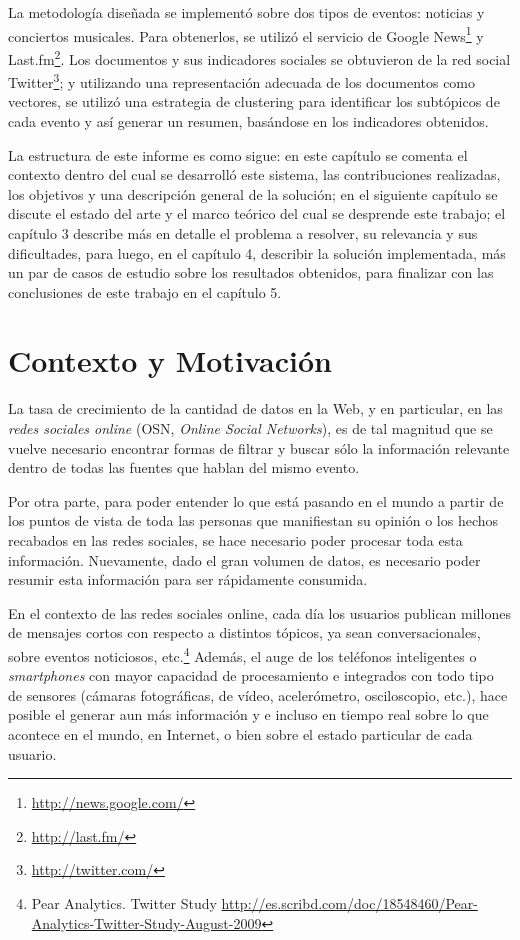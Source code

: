   La metodología diseñada se implementó sobre dos tipos de eventos:
  noticias y conciertos musicales. Para obtenerlos, se utilizó
  el servicio de Google News\footnote{\href{http://news.google.com/}{http://news.google.com/} } y
  Last.fm\footnote{\href{http://last.fm/}{http://last.fm/} }. Los documentos y sus indicadores
  sociales se obtuvieron de la red social
  Twitter\footnote{\href{http://twitter.com/}{http://twitter.com/} }; y utilizando una representación
  adecuada de los documentos como vectores, se utilizó una estrategia
  de clustering para identificar los subtópicos de cada evento y así
  generar un resumen, basándose en los indicadores obtenidos.

  La estructura de este informe es como sigue: en este capítulo se
  comenta el contexto dentro del cual se desarrolló este sistema, las
  contribuciones realizadas, los objetivos y una descripción general
  de la solución; en el siguiente capítulo se discute el estado del
  arte y el marco teórico del cual se desprende este trabajo; el
  capítulo 3 describe más en detalle el problema a resolver, su
  relevancia y sus dificultades, para luego, en el
  capítulo 4, describir la solución implementada, más un par de casos
  de estudio sobre los resultados obtenidos, para finalizar con las
  conclusiones de este trabajo en el capítulo 5.

\section{Contexto y Motivación}
\label{sec-1.1}


   La tasa de crecimiento de la cantidad de datos en la Web, y en
   particular, en las \emph{redes sociales online} (OSN, \emph{Online Social Networks}),
   es de tal magnitud que se vuelve necesario encontrar formas de
   filtrar y buscar sólo la información relevante dentro de todas las
   fuentes que hablan del mismo evento.

   Por otra parte, para poder entender lo que está pasando en el
   mundo a partir de los puntos de vista de toda las personas que
   manifiestan su opinión o los hechos recabados en las redes
   sociales, se hace necesario poder procesar toda esta
   información. Nuevamente, dado el gran volumen de datos, es
   necesario poder resumir esta información para ser rápidamente
   consumida.

   En el contexto de las redes sociales online, cada día los usuarios
   publican  millones de mensajes cortos con respecto a distintos
   tópicos, ya sean conversacionales, sobre eventos noticiosos,
   etc.\footnote{Pear Analytics. Twitter Study \href{http://es.scribd.com/doc/18548460/Pear-Analytics-Twitter-Study-August-2009}{http://es.scribd.com/doc/18548460/Pear-Analytics-Twitter-Study-August-2009} }
   Además, el auge de los teléfonos inteligentes o \emph{smartphones} con mayor
   capacidad de procesamiento e integrados con todo tipo de sensores
   (cámaras fotográficas, de vídeo, acelerómetro, osciloscopio, etc.),
   hace posible el generar aun más información y
   e incluso en tiempo real sobre lo que acontece en el mundo, en
   Internet, o bien sobre el estado particular de cada usuario.

